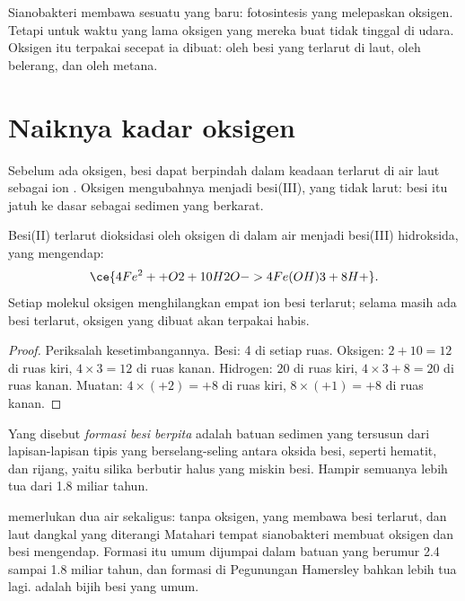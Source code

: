 Sianobakteri membawa sesuatu yang baru: fotosintesis yang melepaskan oksigen.
Tetapi untuk waktu yang lama oksigen yang mereka buat tidak tinggal di udara.
Oksigen itu terpakai secepat ia dibuat: oleh besi yang terlarut di laut, oleh
belerang, dan oleh metana.

\section{Naiknya kadar oksigen}

Sebelum ada oksigen, besi dapat berpindah dalam keadaan terlarut di air laut
sebagai ion . Oksigen mengubahnya menjadi besi(III), yang tidak larut:
besi itu jatuh ke dasar sebagai sedimen yang berkarat.

\begin{proposition}\label{prop:g12:early-earth:iron}
Besi(II) terlarut dioksidasi oleh oksigen di dalam air menjadi besi(III)
hidroksida, yang mengendap:
\[
  \ce{4Fe^2+ + O2 + 10H2O -> 4Fe(OH)3 + 8H+} .
\]
Setiap molekul oksigen menghilangkan empat ion besi terlarut; selama masih ada
besi terlarut, oksigen yang dibuat akan terpakai habis.
\end{proposition}

\begin{proof}
Periksalah kesetimbangannya. Besi: 4 di setiap ruas. Oksigen: $2 + 10 = 12$ di
ruas kiri, $4 \times 3 = 12$ di ruas kanan. Hidrogen: $20$ di ruas kiri, $4 \times 3 + 8 =
20$ di ruas kanan. Muatan: $4 \times (+2) = +8$ di ruas kiri, $8 \times (+1) =
+8$ di ruas kanan.
\end{proof}

\begin{definition}\label{def:g12:early-earth:bif}
Yang disebut \emph{formasi besi berpita} adalah
batuan sedimen yang tersusun dari lapisan-lapisan tipis yang berselang-seling
antara oksida besi, seperti hematit, dan rijang, yaitu silika berbutir halus
yang miskin besi. Hampir semuanya lebih tua dari 1.8 miliar tahun.
\end{definition}

 memerlukan dua air sekaligus:  tanpa oksigen,
yang membawa besi terlarut, dan laut dangkal yang diterangi Matahari tempat
sianobakteri membuat oksigen dan besi mengendap. Formasi itu umum dijumpai dalam
batuan yang berumur 2.4 sampai 1.8 miliar tahun, dan formasi di Pegunungan
Hamersley bahkan lebih tua lagi.  adalah bijih besi yang
umum.

